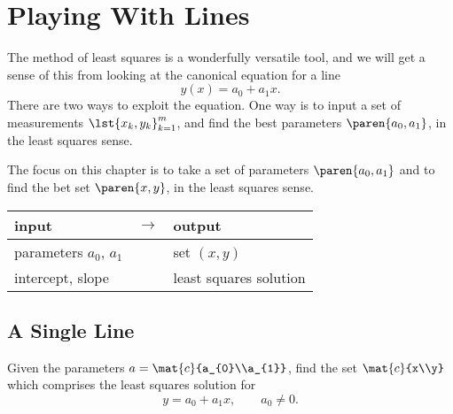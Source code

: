\chapter{Playing With Lines}

The method of least squares is a wonderfully versatile tool, and we will get a sense of this from looking at the canonical equation for a line
  \begin{equation*}   %
      y(x) = a_{0} + a_{1} x.
  \end{equation*}
There are two ways to exploit the equation. One way is to input a set of measurements $\lst{x_{k},y_{k}}_{k=1}^{m}$, and find the best parameters $\paren{a_{0},a_{1}}$, in the least squares sense. 

The focus on this chapter is to take a set of parameters $\paren{a_{0},a_{1}}$ and to find the bet set $\paren{x, y}$, in the least squares sense.	

\begin{table}[htbp]  %
    \begin{center}
        \begin{tabular}{lcl}
            input & $\rightarrow$ & output \\\hline
            parameters $a_{0}$, $a_{1}$ && set $(x, y)$\\
						intercept, slope && least squares solution
        \end{tabular}
    \end{center}
\end{table}%


\section{A Single Line}  %

Given the parameters $a=\mat{c}{a_{0}\\a_{1}}$, find the set $\mat{c}{x\\y}$ which comprises the least squares solution for
  \begin{equation}   %
      y = a_{0} + a_{1} x, \qquad a_{0} \ne 0.
   \label{eq:myline}
  \end{equation}

